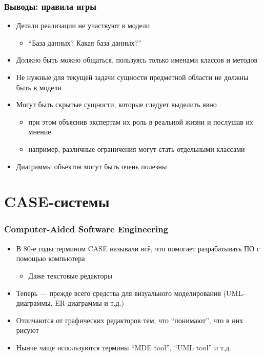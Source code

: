 \documentclass[xetex,mathserif,serif]{beamer}
\begin{document}
	\begin{frame}
		\frametitle{Выводы: правила игры}
		\begin{itemize}
			\item Детали реализации не участвуют в модели
			\begin{itemize}
				\item ``База данных? Какая база данных?''
			\end{itemize}
			\item Должно быть можно общаться, пользуясь только именами классов и методов
			\item Не нужные для текущей задачи сущности предметной области не должны быть в модели
			\item Могут быть скрытые сущности, которые следует выделить явно
			\begin{itemize}
				\item при этом объяснив экспертам их роль в реальной жизни и послушав их мнение
				\item например, различные ограничения могут стать отдельными классами
			\end{itemize}
			\item Диаграммы объектов могут быть очень полезны
		\end{itemize}
	\end{frame}

	\section{CASE-системы}

	\begin{frame}
		\frametitle{Computer-Aided Software Engineering}
		\begin{itemize}
			\item В 80-е годы термином CASE называли всё, что помогает разрабатывать ПО с помощью компьютера
			\begin{itemize}
				\item Даже текстовые редакторы
			\end{itemize}
			\item Теперь --- прежде всего средства для визуального моделирования (UML-диаграммы, ER-диаграммы и т.д.)
			\item Отличаются от графических редакторов тем, что ``понимают'', что в них рисуют
			\item Нынче чаще используются термины ``MDE tool'', ``UML tool'' и т.д.
		\end{itemize}
	\end{frame}
\end{document}
